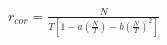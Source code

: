 


\begin{eqnarray*}
  r_{cor} = \frac{N}{T \left[ 1 - a \left( \frac{N}{T} \right) - b \left( \frac{N}{T}
\right)^2
\right]}
\end{eqnarray*}

